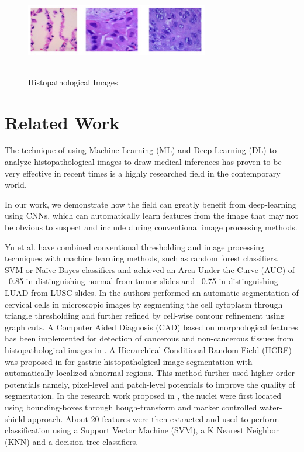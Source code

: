 \documentclass{comjnl}
\begin{document}
 \begin{figure}[htbp]
\centerline{\includegraphics[width=8cm, height=4cm]{./figures/histo_img.png}}
\caption{Histopathological Images}
\label{histo_img}
\end{figure}

\section{Related Work}

The technique of using Machine Learning (ML) and Deep Learning (DL) to analyze histopathological images to draw medical inferences has proven to be very effective in recent times is a highly researched field in the contemporary world. 

In our work, we demonstrate how the field can greatly benefit from deep-learning using CNNs, which can automatically learn features from the image that may not be obvious to suspect and include during conventional image processing methods.

Yu et al. \cite{yu} have combined conventional thresholding and image processing techniques with machine learning methods, such as  random forest classifiers, SVM or Naïve Bayes classifiers and achieved an Area Under the Curve (AUC) of ~0.85 in distinguishing normal from tumor slides and ~0.75 in distinguishing LUAD from LUSC slides. In \cite{hansang} the authors performed an automatic segmentation of cervical cells in microscopic images by segmenting the cell cytoplasm through triangle thresholding and further refined by cell-wise contour refinement using graph cuts. A Computer Aided Diagnosis (CAD) based on morphological features has been implemented for detection of cancerous and non-cancerous tissues from histopathological images in \cite{shukla}. A Hierarchical Conditional Random Field (HCRF) was proposed in \cite{changhao} for gastric histopatholgical image segmentation with automatically localized abnormal regions. This method further used higher-order potentials namely, pixel-level and patch-level potentials to improve the quality of segmentation. In  the research work proposed in \cite{uppada}, the nuclei were first located using bounding-boxes through hough-transform and marker controlled water-shield approach. About 20 features were then extracted and used to perform classification using a Support Vector Machine (SVM), a K Nearest Neighbor (KNN) and a decision tree classifiers.
\end{document}
